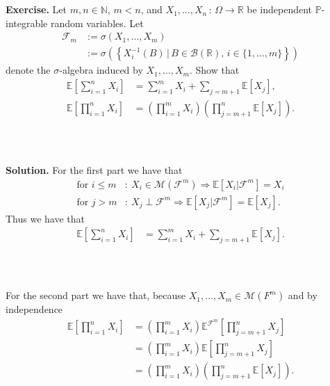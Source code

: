 \documentclass{beamer}
\numberwithin{equation}{section}
\newenvironment{frame2}{\begin{frame}\frametitle{{\normalsize \secname} \\ {\large \subsecname}}}{\end{frame}}
\begin{document}
\begin{frame2}
    \textbf{Exercise.}
    Let $m,n \in \mathbb{N}$, $m < n$, and $X_1, \ldots, X_n \, : \, \Omega \rightarrow \mathbb{R}$ be independent $\mathbb{P}$-integrable random variables.
    Let
    \begin{align}
        \mathcal{F}_m&:=\sigma(X_1,\ldots,X_m)\\
        &:=\sigma\left(\left\{X_i^{-1}(B)\,|\,B\in\mathcal{B}(\mathbb{R}),\, i \in \{1,\ldots,m\} \right\}\right)
    \end{align}
    denote the $\sigma$-algebra induced by $X_1,\ldots,X_m$.
    Show that
    \begin{align}
        \mathbb{E}\left[ \sum_{i = 1}^n X_i \right] &= \sum_{i=1}^m X_i + \sum_{j = m+1}\mathbb{E}\left[X_j\right], \\
        \mathbb{E}\left[ \prod_{i = 1}^n X_i \right] &= \left(\prod_{i=1}^m X_i\right)\left(\prod_{j=m+1}^n \mathbb{E}[X_j]\right).
    \end{align}

    \vspace{10pt}
\end{frame2}

\begin{frame2}
    \textbf{Solution.}
    For the first part we have that
    \begin{align}
        \text{for } i \leq m&: \ X_i \in \mathcal{M}(\mathcal{F}^m) \Rightarrow \mathbb{E}\left[X_i|\mathcal{F}^m\right] = X_i \\
        \text{for } j > m&: \ X_j \perp \mathcal{F}^m \Rightarrow \mathbb{E}\left[X_j|\mathcal{F}^m\right] = \mathbb{E}[X_j].
    \end{align}
    Thus we have that
    \begin{align}
        \mathbb{E}\left[ \sum_{i = 1}^n X_i \right] &= \sum_{i=1}^m X_i + \sum_{j = m+1}\mathbb{E}\left[X_j\right].
    \end{align}
\end{frame2}

\begin{frame2}
    For the second part we have that, because $X_1,\ldots,X_m \in \mathcal{M}(F^m)$ and by independence
    \begin{align}
        \mathbb{E}\left[ \prod_{i = 1}^n X_i \right] &= \left(\prod_{i=1}^m X_i\right) \mathbb{E}^{\mathcal{F}^m}\left[\prod_{j=m+1}^n X_j\right] \\
        &= \left(\prod_{i=1}^m X_i\right) \mathbb{E}\left[\prod_{j=m+1}^n X_j\right] \\
        &= \left(\prod_{i=1}^m X_i\right)\left(\prod_{j=m+1}^n \mathbb{E}[X_j]\right).
    \end{align}
\end{frame2}
\end{document}
